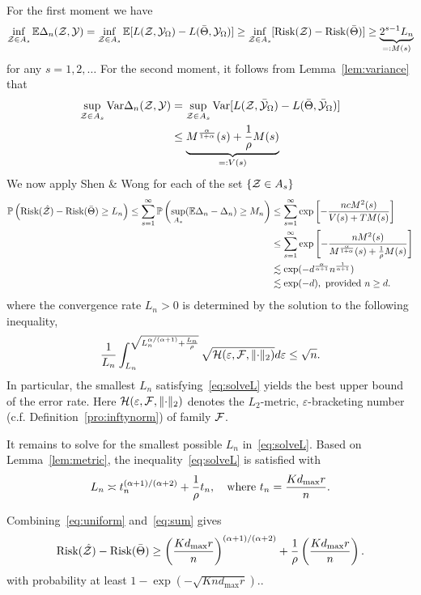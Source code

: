 \documentclass[11pt]{article}
\theoremstyle{definition}
\def\risk{\textup{Risk}}
\newcommand*{\KeepStyleUnderBrace}[1]{%
  \mathop{%
    \mathchoice
    {\underbrace{\displaystyle#1}}%
    {\underbrace{\textstyle#1}}%
    {\underbrace{\scriptstyle#1}}%
    {\underbrace{\scriptscriptstyle#1}}%
  }\limits
}
\begin{document}
For the first moment we have
\[
\inf_{\tZ\in A_s}\mathbb{E}\Delta_n(\tZ, \tY) = \inf_{\tZ\in A_s}\mathbb{E}[L(\tZ,\tY_{\Omega})-L(\bar \Theta, \tY_{\Omega})] \geq \inf_{\tZ\in A_s}[\risk(\tZ)-\risk(\bar \Theta)]\geq \KeepStyleUnderBrace{2^{s-1}L_n}_{=:M(s)}
\]
for any $s=1,2,\ldots$
For the second moment, it follows from Lemma~\ref{lem:variance} that 
\begin{align}
\sup_{\tZ\in A_s}\textup{Var} \Delta_n(\tZ,\tY)
&=\sup_{\tZ\in A_s}\textup{Var}[L(\tZ,\bar \tY_\Omega)-L(\bar \Theta, \bar \tY_\Omega)]\\
&\leq \KeepStyleUnderBrace{M^{\alpha\over 1+\alpha}(s)+{1\over \rho}M(s)}_{=:V(s)}
\end{align}
We now apply Shen \& Wong for each of the set $\{\mathcal{Z}\in A_s\}$
\begin{align}\label{eq:sum}
\mathbb{P}\left(\risk(\hat \tZ)-\risk(\bar \Theta) \geq L_n \right)\leq \sum_{s=1}^\infty\mathbb{P}\left( \sup_{A_s}(\mathbb{E}\Delta_n - \Delta_n) \geq M_n\right)&\leq \sum_{s=1}^{\infty} \exp\left[ -{ncM^2(s) \over V(s)+T M(s)}\right] \\
& \leq \sum_{s=1}^{\infty} \exp\left[-{nM^{2}(s)\over M^{\alpha\over 1+\alpha}(s)+{1\over \rho}M(s)}\right]\\
&\lesssim \exp(-d^{\alpha\over \alpha+1}n^{1\over \alpha+1})\\
& \lesssim \exp(-d), \text{ provided $n\geq d$}.
\end{align}
where the convergence rate $L_n>0$ is determined by the solution to the following inequality,
\begin{equation}\label{eq:solveL}
{1\over L_n}\int_{L_n}^{\sqrt{L_n^{\alpha/(\alpha+1)}+{L_n\over \rho}}}\sqrt{\mathcal{H}(\varepsilon,\mathcal{F}, \lVert\cdot\rVert_2) }d\varepsilon \leq \sqrt{n}. 
\end{equation}
In particular, the smallest $L_n$ satisfying~\eqref{eq:solveL} yields the best upper bound of the error rate. Here $\mathcal{H}(\varepsilon, \mathcal{F},\lVert\cdot\rVert_2)$ denotes the $L_2$-metric, $\varepsilon$-bracketing number (c.f. Definition~\ref{pro:inftynorm}) of family $\mathcal{F}$. 

It remains to solve for the smallest possible $L_n$ in~\eqref{eq:solveL}. Based on Lemma~\ref{lem:metric}, the inequality~\eqref{eq:solveL} is satisfied with 
\begin{equation}\label{eq:tn}
L_n\asymp t_n^{(\alpha+1)/ (\alpha+2)} +{1\over \rho} t_n, \quad \text{where }t_n={Kd_{\max} r \over n}.
\end{equation}

Combining~\eqref{eq:uniform} and~\eqref{eq:sum} gives
\[
\risk(\hat \tZ)-\risk(\bar \Theta) \geq \left( {Kd_{\max} r \over n} \right)^{(\alpha+1)/ (\alpha+2)}+{1\over \rho}\left( {Kd_{\max} r \over n} \right).
\]
with probability at least $1- \exp(-\sqrt{Knd_{\max}r}).$. 




\end{document}
